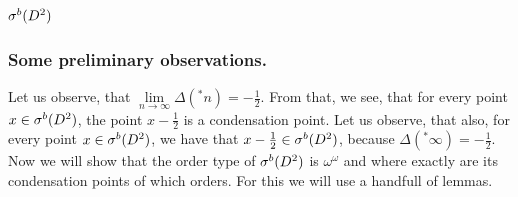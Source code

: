 \subsection{${\mathcal{\sigma}^b(D^2)}$}
\subsubsection{Some preliminary observations.}
Let us observe, that $\lim\limits_{n \to \infty} \Delta(^*n) = -\frac{1}{2}$. From that, we see, 
that for every point $x \in {\mathcal{\sigma}^b(D^2)}$, the point $x - \frac{1}{2}$ is a condensation point. 
Let us observe, that also, for every point $x \in {\mathcal{\sigma}^b(D^2)}$, we have that $x - \frac{1}{2} \in {\mathcal{\sigma}^b(D^2)}$, 
because $\Delta(^*\infty) = -\frac{1}{2}$. \\

Now we will show that the order type of ${\mathcal{\sigma}^b(D^2)}$ is $\omega^\omega$ and where exactly are 
its condensation points of which orders. For this we will use  
a handfull of lemmas. 

